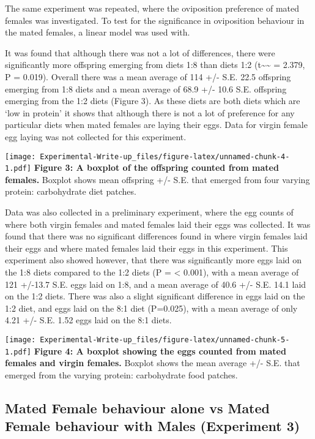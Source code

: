 \documentclass[
]{article}
\begin{document}
The same experiment was repeated, where the oviposition preference of
mated females was investigated. To test for the significance in
oviposition behaviour in the mated females, a linear model was used
with.

It was found that although there was not a lot of differences, there
were significantly more offspring emerging from diets 1:8 than diets 1:2
(t\textasciitilde\textasciitilde{} = 2.379, P = 0.019). Overall there
was a mean average of 114 +/- S.E. 22.5 offspring emerging from 1:8
diets and a mean average of 68.9 +/- 10.6 S.E. offspring emerging from
the 1:2 diets (Figure 3). As these diets are both diets which are `low
in protein' it shows that although there is not a lot of preference for
any particular diets when mated females are laying their eggs. Data for
virgin female egg laying was not collected for this experiment.

\texttt{[image: Experimental-Write-up\_files/figure-latex/unnamed-chunk-4-1.pdf]}
\textbf{Figure 3: A boxplot of the offspring counted from mated
females.} Boxplot shows mean offspring +/- S.E. that emerged from four
varying protein: carbohydrate diet patches.

Data was also collected in a preliminary experiment, where the egg
counts of where both virgin females and mated females laid their eggs
was collected. It was found that there was no significant differences
found in where virgin females laid their eggs and where mated females
laid their eggs in this experiment. This experiment also showed however,
that there was significantly more eggs laid on the 1:8 diets compared to
the 1:2 diets (P = \textless{} 0.001), with a mean average of 121
+/-13.7 S.E. eggs laid on 1:8, and a mean average of 40.6 +/- S.E. 14.1
laid on the 1:2 diets. There was also a slight significant difference in
eggs laid on the 1:2 diet, and eggs laid on the 8:1 diet (P=0.025), with
a mean average of only 4.21 +/- S.E. 1.52 eggs laid on the 8:1 diets.

\texttt{[image: Experimental-Write-up\_files/figure-latex/unnamed-chunk-5-1.pdf]}
\textbf{Figure 4: A boxplot showing the eggs counted from mated females
and virgin females.} Boxplot shows the mean average +/- S.E. that
emerged from the varying protein: carbohydrate food patches.

\hypertarget{mated-female-behaviour-alone-vs-mated-female-behaviour-with-males-experiment-3}{%
\subsection{Mated Female behaviour alone vs Mated Female behaviour with
Males (Experiment
3)}\label{mated-female-behaviour-alone-vs-mated-female-behaviour-with-males-experiment-3}}
\end{document}
